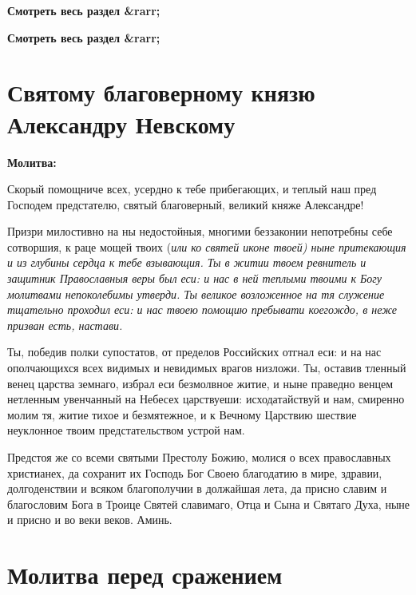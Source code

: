 


\bfseries Смотреть весь раздел &rarr;\normalfont{} 


\bfseries Смотреть весь раздел &rarr;\normalfont{} 

\section{Святому благоверному князю Александру Невскому}
 


\bfseries Молитва:\normalfont{}


Скорый помощниче всех, усердно к тебе прибегающих, и теплый наш пред Господем предстателю, святый благоверный, великий княже Александре! 

Призри милостивно на ны недостойныя, многими беззаконии непотребны себе сотворшия, к раце мощей твоих (\itshape или\normalfont{} ко святей иконе твоей) ныне притекающия и из глубины сердца к тебе взывающия. Ты в житии твоем ревнитель и защитник Православныя веры был еси: и нас в ней теплыми твоими к Богу молитвами непоколебимы утверди. Ты великое возложенное на тя служение тщательно проходил еси: и нас твоею помощию пребывати коегождо, в неже призван есть, настави. 

Ты, победив полки супостатов, от пределов Российских отгнал еси: и на нас ополчающихся всех видимых и невидимых врагов низложи. Ты, оставив тленный венец царства земнаго, избрал еси безмолвное житие, и ныне праведно венцем нетленным увенчанный на Небесех царствуеши: исходатайствуй и нам, смиренно молим тя, житие тихое и безмятежное, и к Вечному Царствию шествие неуклонное твоим предстательством устрой нам. 

Предстоя же со всеми святыми Престолу Божию, молися о всех православных христианех, да сохранит их Господь Бог Своею благодатию в мире, здравии, долгоденствии и всяком благополучии в должайшая лета, да присно славим и благословим Бога в Троице Святей славимаго, Отца и Сына и Святаго Духа, ныне и присно и во веки веков. Аминь.


\section{Молитва перед сражением}
 
